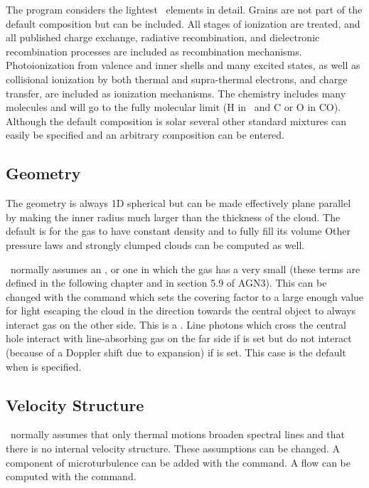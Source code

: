 \noindent The program considers the lightest \LIMELM\ elements in detail.
Grains are
not part of the default composition but can be included.
All stages of
ionization are treated, and all published charge exchange, radiative
recombination, and dielectronic recombination processes are included as
recombination mechanisms.
Photoionization from valence and inner shells
and many excited states, as well as collisional ionization by
both thermal and supra-thermal electrons, and charge transfer, are included as ionization mechanisms.
The chemistry includes many molecules and will go to the fully
molecular limit (H in \htwo\ and C or O in CO).
Although the default composition
is solar several other standard mixtures can easily be specified and an
arbitrary composition can be entered.

\subsection{Geometry}

\noindent The geometry is always 1D spherical but can be made effectively plane
parallel by making the inner radius much larger than the thickness of the
cloud.  The default is for the gas to have constant density and to fully
fill its volume
Other pressure laws and strongly clumped clouds can be computed as well.

\Cloudy\ normally assumes an ,
or one in which the gas has
a very small 
(these terms are defined in the following chapter
and in section 5.9 of AGN3).
This can be changed with
the  command which sets the covering factor
to a large enough value for light escaping
the cloud in the direction towards the central object to always interact
gas on the other side.
This is a .
Line photons which
cross the central hole interact with line-absorbing gas on the far side
if  is set but do not interact (because of a Doppler shift
due to expansion) if  is set.
This case is the default when  is specified.

\subsection{Velocity Structure}

\noindent \Cloudy\ normally assumes that only thermal motions broaden spectral lines and that there is no internal velocity structure.
These assumptions can be changed.
A component of microturbulence can be added with the
 command.
A flow can be computed with the  command.

